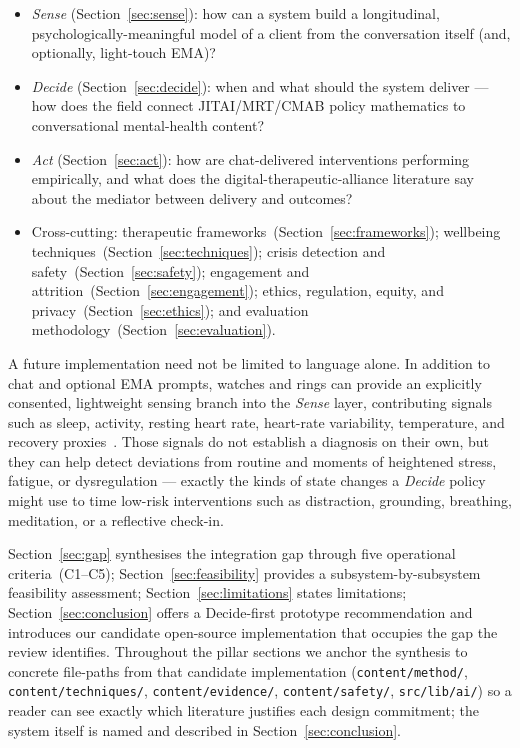 \documentclass[10pt,conference]{article}
\newcommand{\secref}[1]{Section~\ref{#1}}
\begin{document}
\begin{itemize}\setlength{\itemsep}{0pt}
  \item \emph{Sense} (\secref{sec:sense}): how can a system build a
    longitudinal, psychologically-meaningful model of a client from
    the conversation itself (and, optionally, light-touch EMA)?
  \item \emph{Decide} (\secref{sec:decide}): when and what should the
    system deliver --- how does the field connect JITAI/MRT/CMAB
    policy mathematics to conversational mental-health content?
  \item \emph{Act} (\secref{sec:act}): how are chat-delivered
    interventions performing empirically, and what does the
    digital-therapeutic-alliance literature say about the mediator
    between delivery and outcomes?
  \item Cross-cutting: therapeutic frameworks~(\secref{sec:frameworks});
    wellbeing techniques~(\secref{sec:techniques});
    crisis detection and safety~(\secref{sec:safety});
    engagement and attrition~(\secref{sec:engagement});
    ethics, regulation, equity, and privacy~(\secref{sec:ethics});
    and evaluation methodology~(\secref{sec:evaluation}).
\end{itemize}

A future implementation need not be limited to language alone. In
addition to chat and optional EMA prompts, watches and rings can
provide an explicitly consented, lightweight sensing branch into the
\emph{Sense} layer, contributing signals such as sleep, activity,
resting heart rate, heart-rate variability, temperature, and recovery
proxies~\cite{Sequeira2021PassiveSensing,Laborde2017HRV}. Those
signals do not establish a diagnosis on their own, but they can help
detect deviations from routine and moments of heightened stress,
fatigue, or dysregulation --- exactly the kinds of state changes a
\emph{Decide} policy might use to time low-risk interventions such as
distraction, grounding, breathing, meditation, or a reflective
check-in.

\secref{sec:gap} synthesises the integration gap through five
operational criteria~(C1--C5); \secref{sec:feasibility} provides a
subsystem-by-subsystem feasibility assessment;
\secref{sec:limitations} states limitations; \secref{sec:conclusion}
offers a Decide-first prototype recommendation and introduces our
candidate open-source implementation that occupies the gap the
review identifies. Throughout the pillar sections we anchor the
synthesis to concrete file-paths from that candidate implementation
(\texttt{content/method/}, \texttt{content/techniques/},
\texttt{content/evidence/}, \texttt{content/safety/},
\texttt{src/lib/ai/}) so a reader can see exactly which literature
justifies each design commitment; the system itself is named and
described in \secref{sec:conclusion}.
\end{document}

